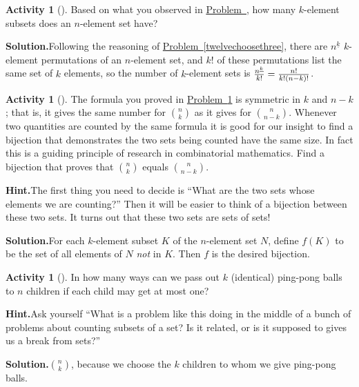 \documentclass[10pt,]{book}
\theoremstyle{plain}
\theoremstyle{definition}
\newtheorem{activity}[project]{Activity}
\numberwithin{equation}{chapter}
\begin{document}
\begin{activity}[]\label{nchoosek}
Based on what you observed in \hyperref[twelvechoosethreefinal]{Problem~}, how many \(k\)-element subsets does an \(n\)-element set have?%
\par\medskip\noindent%
\textbf{Solution.}\quad Following the reasoning of \hyperref[twelvechoosethree]{Problem~\ref{twelvechoosethree}}, there are \(n^{\underline{k}}\) \(k\)-element permutations of an \(n\)-element set, and \(k!\) of these permutations list the same set of \(k\) elements, so the number of \(k\)-element sets is \({n^{\underline{k}}\over k!}= {n!\over k!(n-k)!}\).%
\end{activity}
\begin{activity}[]\label{activity-36}
The formula you proved in \hyperref[nchoosek]{Problem~\ref{nchoosek}} is symmetric in \(k\) and \(n-k\); that is, it gives the same number for \(n\choose k\) as it gives for \(n\choose n-k\). Whenever two quantities are counted by the same formula it is good for our insight to find a bijection that demonstrates the two sets being counted have the same size. In fact this is a guiding principle of research in combinatorial mathematics. Find a bijection that proves that \(n\choose k\) equals \(n\choose n-k\).%
\par\medskip\noindent%
\textbf{Hint.}\quad The first thing you need to decide is “What are the two sets whose elements we are counting?” Then it will be easier to think of a bijection between these two sets. It turns out that these two sets are sets of sets!\par\medskip\noindent%
\textbf{Solution.}\quad For each \(k\)-element subset \(K\) of the \(n\)-element set \(N\), define \(f(K)\) to be the set of all elements of \(N\) \emph{not} in \(K\). Then \(f\) is the desired bijection.%
\end{activity}
\begin{activity}[]\label{ping-pong}
In how many ways can we pass out \(k\) (identical) ping-pong balls to \(n\) children if each child may get at most one?%
\par\medskip\noindent%
\textbf{Hint.}\quad Ask yourself “What is a problem like this doing in the middle of a bunch of problems about counting subsets of a set? Is it related, or is it supposed to gives us a break from sets?”\par\medskip\noindent%
\textbf{Solution.}\quad \(n\choose k\), because we choose the \(k\) children to whom we give ping-pong balls.%
\end{activity}
\end{document}
